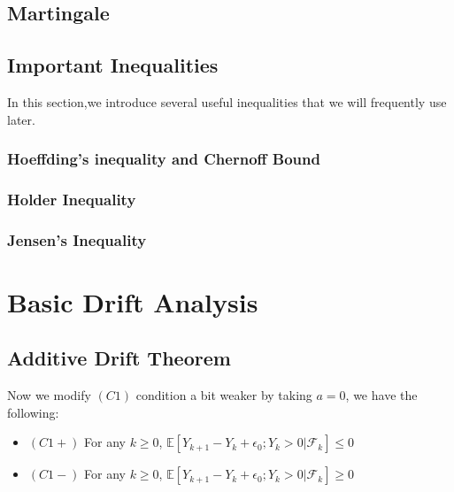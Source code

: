 \documentclass[a4paper,11pt]{report}
\theoremstyle{plain} %
\theoremstyle{definition} %
\theoremstyle{remark} %
\begin{document}
\subsection{Martingale}

\subsection{Important Inequalities} In this section,we introduce several useful inequalities that we will frequently use later.

\subsubsection{Hoeffding's inequality and Chernoff Bound}

\subsubsection{Holder Inequality}

\subsubsection{Jensen's Inequality}


\section{Basic Drift Analysis}

\subsection{Additive Drift Theorem}
\par Now we modify $(C1)$ condition a bit weaker by taking $a=0$, we have the following:

\begin{itemize}
    \item $(C1+)$ For any $k\geq 0$, $\mathbb{E}[Y_{k+1}-Y_{k}+\epsilon_{0};Y_{k}>0| \mathcal{F}_{k} ]\leq 0$
    
    \item $(C1-)$ For any $k\geq 0$, $\mathbb{E}[Y_{k+1}-Y_{k}+\epsilon_{0};Y_{k}>0| \mathcal{F}_{k} ]\geq 0$
\end{itemize}
\end{document}
